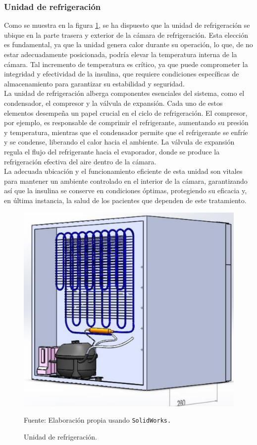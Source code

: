  \subsubsection{Unidad de refrigeración}
Como se muestra en la figura \ref{fig:4-coolerunit}, se ha dispuesto que la unidad de refrigeración se ubique en la parte trasera y exterior de la cámara de refrigeración. Esta elección es fundamental, ya que la unidad genera calor durante su operación, lo que, de no estar adecuadamente posicionada, podría elevar la temperatura interna de la cámara. Tal incremento de temperatura es crítico, ya que puede comprometer la integridad y efectividad de la insulina, que requiere condiciones específicas de almacenamiento para garantizar su estabilidad y seguridad.\\
La unidad de refrigeración alberga componentes esenciales del sistema, como el condensador, el compresor y la válvula de expansión. Cada uno de estos elementos desempeña un papel crucial en el ciclo de refrigeración. El compresor, por ejemplo, es responsable de comprimir el refrigerante, aumentando su presión y temperatura, mientras que el condensador permite que el refrigerante se enfríe y se condense, liberando el calor hacia el ambiente. La válvula de expansión regula el flujo del refrigerante hacia el evaporador, donde se produce la refrigeración efectiva del aire dentro de la cámara.\\
La adecuada ubicación y el funcionamiento eficiente de esta unidad son vitales para mantener un ambiente controlado en el interior de la cámara, garantizando así que la insulina se conserve en condiciones óptimas, protegiendo su eficacia y, en última instancia, la salud de los pacientes que dependen de este tratamiento.
 
 \begin{figure}[H]
 	\centering
 	\includegraphics[width=0.4\linewidth]{figures/4-cooler_unit}
 	\caption{Unidad de refrigeración.}
 	Fuente: Elaboración propia usando \texttt{SolidWorks.}
 	\label{fig:4-coolerunit}
 \end{figure}
  
